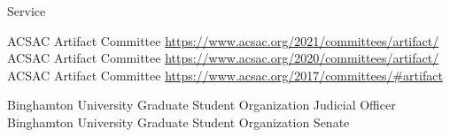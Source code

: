 
\begin{rubric}{Service}

\entry*[2021] ACSAC Artifact Committee \url{https://www.acsac.org/2021/committees/artifact/}
\entry*[2020] ACSAC Artifact Committee \url{https://www.acsac.org/2020/committees/artifact/}
\entry*[2017] ACSAC Artifact Committee \url{https://www.acsac.org/2017/committees/#artifact}

\entry*[2018\--2019] Binghamton University Graduate Student Organization Judicial Officer
\entry*[2016\--2018] Binghamton University Graduate Student Organization Senate

\end{rubric}